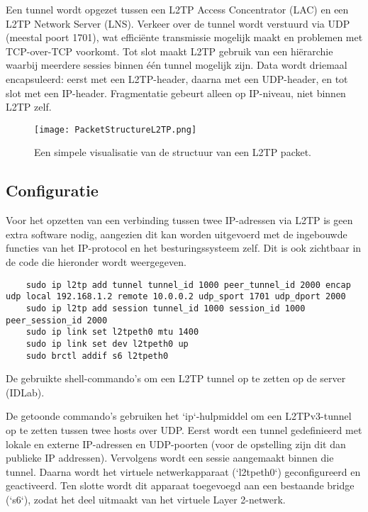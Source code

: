 Een tunnel wordt opgezet tussen een L2TP Access Concentrator (LAC) en een L2TP Network Server (LNS). Verkeer over de tunnel wordt verstuurd via UDP (meestal poort 1701), wat efficiënte transmissie mogelijk maakt en problemen met TCP-over-TCP voorkomt.
Tot slot maakt L2TP gebruik van een hiërarchie waarbij meerdere sessies binnen één tunnel mogelijk zijn. Data wordt driemaal encapsuleerd: eerst met een L2TP-header, daarna met een UDP-header, en tot slot met een IP-header. Fragmentatie gebeurt alleen op IP-niveau, niet binnen L2TP zelf.

\begin{figure}[H]
    \centering
    \texttt{[image: PacketStructureL2TP.png]}
    \caption[Structuur van L2TP]{\label{fig:L2TPStructure}Een simpele visualisatie van de structuur van een L2TP packet.}
\end{figure}

\subsection{Configuratie}
Voor het opzetten van een verbinding tussen twee IP-adressen via L2TP is geen extra software nodig, aangezien dit kan worden uitgevoerd met de ingebouwde functies van het IP-protocol en het besturingssysteem zelf.
Dit is ook zichtbaar in de code die hieronder wordt weergegeven.
\begin{listing}[H]
\begin{verbatim}
    sudo ip l2tp add tunnel tunnel_id 1000 peer_tunnel_id 2000 encap udp local 192.168.1.2 remote 10.0.0.2 udp_sport 1701 udp_dport 2000
    sudo ip l2tp add session tunnel_id 1000 session_id 1000 peer_session_id 2000
    sudo ip link set l2tpeth0 mtu 1400
    sudo ip link set dev l2tpeth0 up
    sudo brctl addif s6 l2tpeth0
\end{verbatim}
\caption[Configuratie L2TP Server]{De gebruikte shell-commando's om een L2TP tunnel op te zetten op de server (IDLab).}
\end{listing}

De getoonde commando's gebruiken het `ip`-hulpmiddel om een L2TPv3-tunnel op te zetten tussen twee hosts over UDP. 
Eerst wordt een tunnel gedefinieerd met lokale en externe IP-adressen en UDP-poorten (voor de opstelling zijn dit dan publieke IP addressen). 
Vervolgens wordt een sessie aangemaakt binnen die tunnel. Daarna wordt het virtuele netwerkapparaat (`l2tpeth0`) geconfigureerd en geactiveerd. 
Ten slotte wordt dit apparaat toegevoegd aan een bestaande bridge (`s6`), zodat het deel uitmaakt van het virtuele Layer 2-netwerk.


